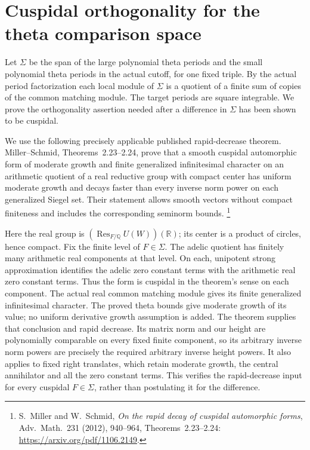 
\section{Cuspidal orthogonality for the theta comparison space}
\label{sec:sr-theta-cuspidal-orthogonality}

Let \(\Sigma\) be the span of the large polynomial theta periods
and the small polynomial theta periods in the actual cutoff,
for one fixed triple. By the actual period factorization each
local module of \(\Sigma\) is a quotient of a finite sum of
copies of the common matching module. The target periods are
square integrable. We prove the orthogonality assertion needed
after a difference in \(\Sigma\) has been shown to be cuspidal.

We use the following precisely applicable published rapid-decrease
theorem. Miller--Schmid, Theorems~2.23--2.24, prove that a smooth
cuspidal automorphic form of moderate growth and finite
generalized infinitesimal character on an arithmetic quotient
of a real reductive group with compact center has uniform
moderate growth and decays faster than every inverse norm
power on each generalized Siegel set. Their statement allows
smooth vectors without compact finiteness and includes the
corresponding seminorm bounds.
\footnote{S.~Miller and W.~Schmid, \emph{On the rapid decay of
cuspidal automorphic forms}, Adv.~Math.~231 (2012), 940--964,
Theorems~2.23--2.24:
\url{https://arxiv.org/pdf/1106.2149}.}

Here the real group is
\((\operatorname{Res}_{F/\mathbb Q}U(W))(\mathbb R)\);
its center is a product of circles, hence compact.
Fix the finite level of \(F\in\Sigma\).
The adelic quotient has finitely many arithmetic real
components at that level. On each, unipotent strong
approximation identifies the adelic zero constant terms
with the arithmetic real zero constant terms.
Thus the form is cuspidal in the theorem's sense on each
component. The actual real common matching module gives
its finite generalized infinitesimal character.
The proved theta bounds give moderate growth of its value;
no uniform derivative growth assumption is added.
The theorem supplies that conclusion and rapid decrease.
Its matrix norm and our height are polynomially comparable
on every fixed finite component, so its arbitrary inverse
norm powers are precisely the required arbitrary inverse
height powers. It also applies to fixed right translates,
which retain moderate growth, the central annihilator
and all the zero constant terms.
This verifies the rapid-decrease input for every cuspidal
\(F\in\Sigma\), rather than postulating it for the difference.

